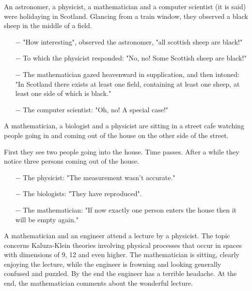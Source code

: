 An astronomer, a physicist, a mathematician and a computer scientist (it is said) were holidaying in Scotland. Glancing from a train window, they observed a black sheep in the middle of a field. 

\begin{itemize}	 
	\item[$-$] "How interesting", observed the astronomer, "all scottish sheep are black!" 

	\item[$-$] To which the physicist responded: "No, no! Some Scottish sheep are black!" 

	\item[$-$] The mathematician gazed heavenward in supplication, and then intoned: "In Scotland there exists at least one field, containing at least one sheep, at least one side of which is black."

	\item[$-$] The computer scientist: "Oh, no! A special case!"	
	
\end{itemize}
	\begin{center}\underline{\hspace{5 cm}}\end{center}	
	
A mathematician, a biologist and a physicist are sitting in a street cafe watching people going in and coming out of the house on the other side of the street. 

First they see two people going into the house. Time passes. After a while they notice three persons coming out of the house. 

\begin{itemize}	 
	\item[$-$] The physicist: "The measurement wasn't accurate."

	\item[$-$] The biologists: "They have reproduced".

	\item[$-$] The mathematician: "If now exactly one person enters the house then it will be empty again."
\end{itemize}
	\begin{center}\underline{\hspace{5 cm}}\end{center}

A mathematician and an engineer attend a lecture by a physicist. The topic concerns Kaluza-Klein theories involving physical processes that occur in spaces with dimensions of 9, 12 and even higher. The mathematician is sitting, clearly enjoying the lecture, while the engineer is frowning and looking generally confused and puzzled. By the end the engineer has a terrible headache. At the end, the mathematician comments about the wonderful lecture. 

